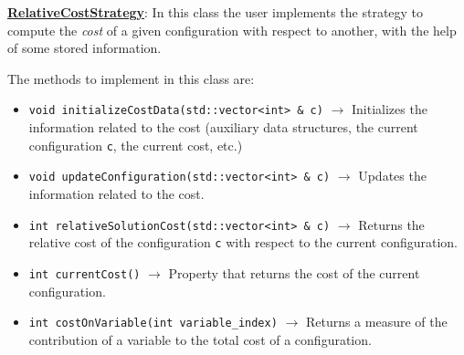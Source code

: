 \underline{\textbf{RelativeCostStrategy}}: In this class the user implements the strategy to compute the \textit{cost} of a given configuration with respect to another, with the help of some stored information.


The methods to implement in this class are:

\begin{itemize}
\item \verb!void initializeCostData(std::vector<int> & c)! $\rightarrow$ Initializes the information related to the cost (auxiliary data structures, the current configuration \verb!c!, the current cost, etc.)
\item \verb!void updateConfiguration(std::vector<int> & c)! $\rightarrow$ Updates the information related to the cost.
\item \verb!int relativeSolutionCost(std::vector<int> & c)! $\rightarrow$ Returns the relative cost of the configuration \verb!c! with respect to the current configuration.
\item \verb!int currentCost()! $\rightarrow$ Property that returns the cost of the current configuration.
\item \verb!int costOnVariable(int variable_index)! $\rightarrow$ Returns a measure of the contribution of a variable to the total cost of a configuration. %
\end{itemize}

